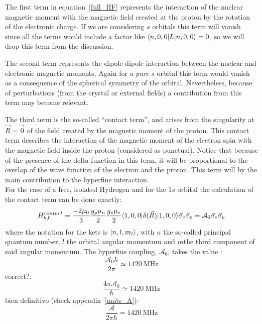 The first term in equation~\eqref{full_HF} represents the interaction of the nuclear magnetic moment with the magnetic field created at the proton by the rotation of the electronic charge. If we are considering $s$ orbitals this term will vanish since all the terms would include a factor like $\langle n,0,0|L|n,0,0\rangle = 0$, so we will drop this term from the discussion.

The second term represents the dipole-dipole interaction between the nuclear and electronic magnetic moments. Again for a \textit{pure} $s$ orbital this term would vanish as a consequence of the spherical symmetry of the orbital. Nevertheless, because of perturbations (from the crystal or external fields) a contribution from this term may become relevant. 

The third term is the so-called ``contact term'', and arises from the singularity at $\vec{R}=\vec{0}$ of the field created by the magnetic moment of the proton.
This contact term describes the interaction of the magnetic moment of the electron spin with the magnetic field inside the proton (considered as punctual). Notice that because of the presence of the delta function in this term, it will be proportional to the overlap of the wave function of the electron and the proton. This term will by the main contribution to the hyperfine interaction.\\

For the case of a free, isolated Hydrogen and for the $1s$ orbital the calculation of the contact term can be done exactly:
\begin{equation}
H^{contact}_{hf} =
\frac{-2\mu_0}{3}\frac{g_{p}\mu_{n}}{2}
\frac{g_{e}\mu_{e}}{2} \langle1,0,0|\delta(\vec{R})
|1,0,0\rangle  \vec{\sigma}_e\vec{\sigma}_p =
\mathcal{A}_{0}\vec{\sigma}_e\vec{\sigma}_p
\end{equation}
where the notation for the kets is $|n,l,m_{l}\rangle$, with $n$ the so-called principal quantum number, $l$ the orbital angular momentum and $m $the third component of said angular momentum. The hyperfine coupling, $\mathcal{A}_{0}$, takes the value : %
\begin{equation}
\frac{\mathcal{A}_{0}\hbar}{2\pi} \simeq \SI{1420}{\MHz}
\end{equation}
correct?:
\begin{equation}
\frac{4\pi\mathcal{A}_{0}}{\hbar} \simeq \SI{1420}{\MHz}
\end{equation}
bien definitivo (check appendix~\ref{units_A}):
\begin{equation}
  \frac{\mathcal{A}}{2\pi\hbar} = \SI{1420}{\MHz}
\end{equation}


